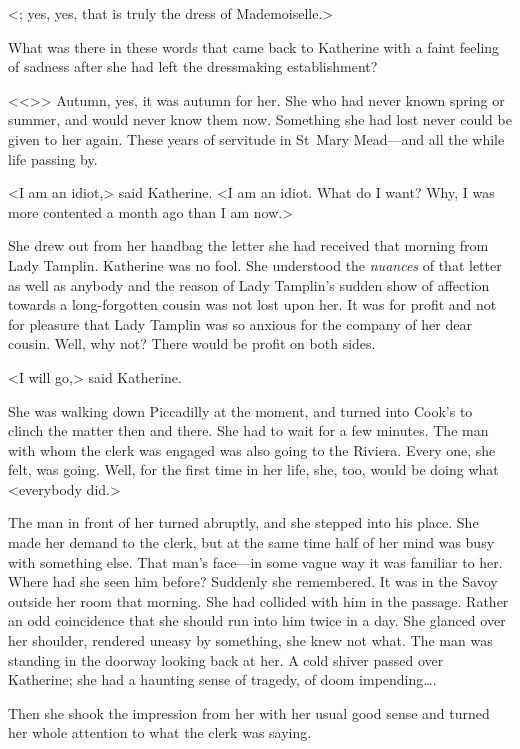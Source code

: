 <; yes, yes, that is truly the dress of Mademoiselle.>

What was there in these words that came back to Katherine with a faint feeling of sadness after she had left the dressmaking establishment?

<<>> Autumn, yes, it was autumn for her. She who had never known spring or summer, and would never know them now. Something she had lost never could be given to her again. These years of servitude in St~Mary Mead—and all the while life passing by.

<I am an idiot,> said Katherine. <I am an idiot. What do I want? Why, I was more contented a month ago than I am now.>

She drew out from her handbag the letter she had received that morning from Lady Tamplin. Katherine was no fool. She understood the \emph{nuances} of that letter as well as anybody and the reason of Lady Tamplin's sudden show of affection towards a long-forgotten cousin was not lost upon her. It was for profit and not for pleasure that Lady Tamplin was so anxious for the company of her dear cousin. Well, why not? There would be profit on both sides.

<I will go,> said Katherine.

She was walking down Piccadilly at the moment, and turned into Cook's to clinch the matter then and there. She had to wait for a few minutes. The man with whom the clerk was engaged was also going to the Riviera. Every one, she felt, was going. Well, for the first time in her life, she, too, would be doing what <everybody did.>

The man in front of her turned abruptly, and she stepped into his place. She made her demand to the clerk, but at the same time half of her mind was busy with something else. That man's face—in some vague way it was familiar to her. Where had she seen him before? Suddenly she remembered. It was in the Savoy outside her room that morning. She had collided with him in the passage. Rather an odd coincidence that she should run into him twice in a day. She glanced over her shoulder, rendered uneasy by something, she knew not what. The man was standing in the doorway looking back at her. A cold shiver passed over Katherine; she had a haunting sense of tragedy, of doom impending\dots.

Then she shook the impression from her with her usual good sense and turned her whole attention to what the clerk was saying.